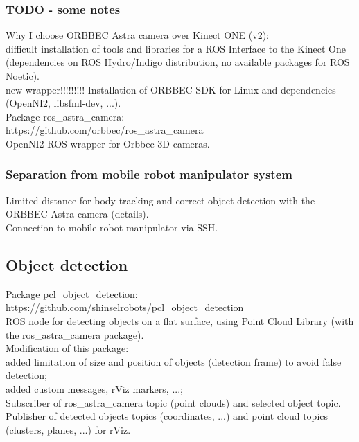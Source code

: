 \subsubsection{TODO - some notes}
Why I choose ORBBEC Astra camera over Kinect ONE (v2):\\
difficult installation of tools and libraries for a ROS Interface to the Kinect One (dependencies on ROS Hydro/Indigo distribution, no available packages for ROS Noetic).\\
new wrapper!!!!!!!!!
Installation of ORBBEC SDK for Linux and dependencies (OpenNI2, libsfml-dev, ...).\\

 Package ros\_astra\_camera:\\
 https://github.com/orbbec/ros\_astra\_camera\\
 OpenNI2 ROS wrapper for Orbbec 3D cameras.\\

\subsubsection{Separation from mobile robot manipulator system}

Limited distance for body tracking and correct object detection with the ORBBEC Astra camera (details).\\

Connection to mobile robot manipulator via SSH.\\

\subsection{Object detection}
Package pcl\_object\_detection:\\
https://github.com/shinselrobots/pcl\_object\_detection\\
ROS node for detecting objects on a flat surface, using Point Cloud Library (with the ros\_astra\_camera package).\\

Modification of this package: \\
added limitation of size and position of objects (detection frame) to avoid false detection;\\
added custom messages, rViz markers, ...;\\

Subscriber of ros\_astra\_camera topic (point clouds) and selected object topic.\\
Publisher of detected objects topics (coordinates, ...) and point cloud topics (clusters, planes, ...) for rViz.\\

